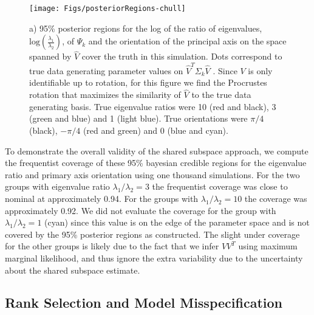 \documentclass[12pt]{article}
\begin{document}
\begin{figure}[t]
    \centering
    \texttt{[image: Figs/posteriorRegions-chull]}
        \label{fig:simPosterior}
    \caption{a) 95\% posterior regions for the log of the ratio of
      eigenvalues, $\text{log}(\frac{\lambda_1}{\lambda_2})$, of $\Psi_k$ and the
      orientation of the principal axis on the space spanned by $\hat{V}$
      cover the truth in this simulation.  Dots correspond to true data generating
      parameter values on $\hat{V}^T\Sigma_k\hat{V}$ .  Since $V$
      is only identifiable up to rotation, for this figure we find the Procrustes
      rotation that maximizes the similarity of $\hat{V}$ to the true
      data generating basis. True eigenvalue ratios were 10 (red and
      black), 3 (green and blue) and 1 (light blue).  True
      orientations were $\pi/4$ (black), $-\pi/4$ (red and green) and
      0 (blue and cyan). %
    }
\end{figure}

To demonstrate the overall validity of the shared subspace approach,
we compute the frequentist coverage of these 95\% bayesian credible
regions for the eigenvalue ratio and primary axis orientation using
one thousand simulations.  For the two groups with eigenvalue ratio
$\lambda_1/\lambda_2 = 3$ the frequentist coverage was close to
nominal at approximately 0.94.  For the groups with
$\lambda_1/\lambda_2 = 10$ the coverage was approximately 0.92.  We
did not evaluate the coverage for the group with
$\lambda_1/\lambda_2 = 1$ (cyan) since this value is on the edge of the
parameter space and is not covered by the 95\% posterior regions
as constructed.  The slight under coverage for the other groups is likely due to the fact
that we infer $VV^T$ using maximum marginal likelihood, and thus
ignore the extra variability due to the uncertainty about the shared
subspace estimate.

\subsection{Rank Selection and Model Misspecification}
\end{document}
